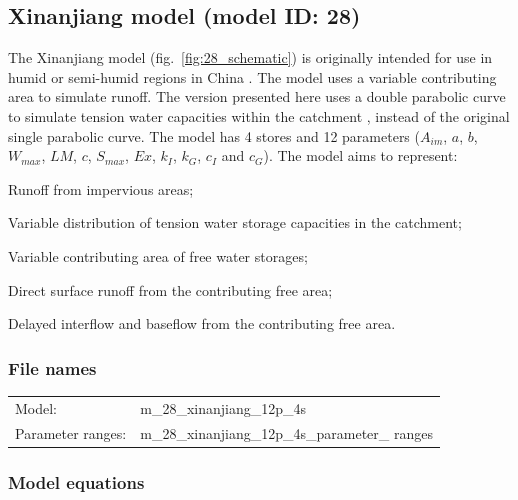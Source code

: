 \subsection{Xinanjiang model (model ID: 28)}
The Xinanjiang model (fig.~\ref{fig:28_schematic}) is originally intended for use in humid or semi-humid regions in China \citep{Zhao1992}. The model uses a variable contributing area to simulate runoff. The version presented here uses a double parabolic curve to simulate tension water capacities within the catchment \citep{Jayawardena2000}, instead of the original single parabolic curve. The model has 4 stores and 12 parameters ($A_{im}$, $a$, $b$, $W_{max}$, $LM$, $c$, $S_{max}$, $Ex$, $k_I$, $k_G$, $c_I$ and $c_G$). The model aims to represent:

\begin{itemizecompact}
\item Runoff from impervious areas;
\item Variable distribution of tension water storage capacities in the catchment;
\item Variable contributing area of free water storages;
\item Direct surface runoff from the contributing free area;
\item Delayed interflow and baseflow from the contributing free area.
\end{itemizecompact}

\subsubsection{File names}
\begin{tabular}{@{}ll}
Model: &m\_28\_xinanjiang\_12p\_4s \\
Parameter ranges: &m\_28\_xinanjiang\_12p\_4s\_parameter\_ ranges \\
\end{tabular}

\subsubsection{Model equations}

